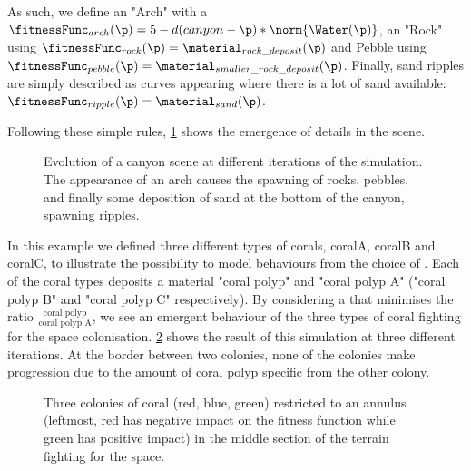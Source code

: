 As such, we define an  "Arch" with a  $\fitnessFunc_{arch}(\p) = 5 - d(canyon - \p) * \norm{\Water(\p)}$, an  "Rock" using $\fitnessFunc_{rock}(\p) = \material_{rock\_deposit}(\p)$ and Pebble using $\fitnessFunc_{pebble}(\p) = \material_{smaller\_rock\_deposit}(\p)$. Finally, sand ripples are simply described as curves appearing where there is a lot of sand available: $\fitnessFunc_{ripple}(\p) = \material_{sand}(\p)$.

Following these simple rules, \cref{fig:env-obj-canyon-scene} shows the emergence of details in the scene.

\begin{figure}
    \caption{Evolution of a canyon scene at different iterations of the simulation. The appearance of an arch causes the spawning of rocks, pebbles, and finally some deposition of sand at the bottom of the canyon, spawning ripples.}
    \label{fig:env-obj-canyon-scene}
\end{figure}

In this example we defined three different types of corals, coralA, coralB and coralC, to illustrate the possibility to model behaviours from the choice of . Each of the coral types deposits a material "coral polyp" and "coral polyp A" ("coral polyp B" and "coral polyp C" respectively). By considering a  that minimises the ratio $\frac{\text{coral polyp}}{\text{coral polyp A}}$, we see an emergent behaviour of the three types of coral fighting for the space colonisation.
\cref{fig:env-obj-coral-colonization-scene} shows the result of this simulation at three different iterations. At the border between two colonies, none of the colonies make progression due to the amount of coral polyp specific from the other colony.

\begin{figure}
    \caption{Three colonies of coral (red, blue, green) restricted to an annulus (leftmost, red has negative impact on the fitness function while green has positive impact) in the middle section of the terrain fighting for the space.}
    \label{fig:env-obj-coral-colonization-scene}
\end{figure}

